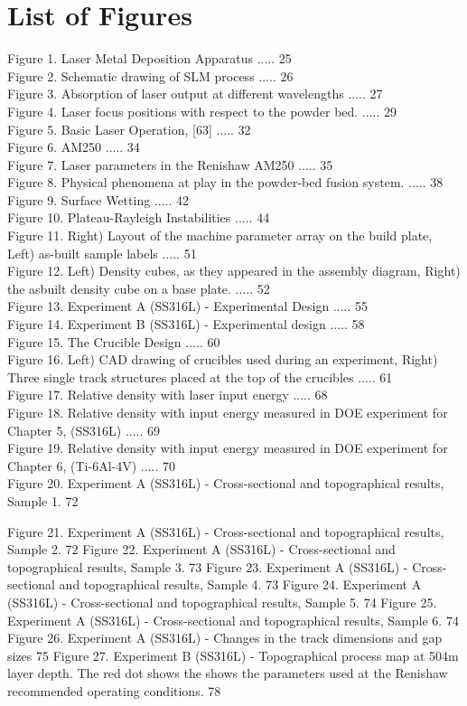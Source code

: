 \documentclass[10pt]{article}
\begin{document}
\section*{List of Figures}
Figure 1. Laser Metal Deposition Apparatus ..... 25\\
Figure 2. Schematic drawing of SLM process ..... 26\\
Figure 3. Absorption of laser output at different wavelengths ..... 27\\
Figure 4. Laser focus positions with respect to the powder bed. ..... 29\\
Figure 5. Basic Laser Operation, [63] ..... 32\\
Figure 6. AM250 ..... 34\\
Figure 7. Laser parameters in the Renishaw AM250 ..... 35\\
Figure 8. Physical phenomena at play in the powder-bed fusion system. ..... 38\\
Figure 9. Surface Wetting ..... 42\\
Figure 10. Plateau-Rayleigh Instabilities ..... 44\\
Figure 11. Right) Layout of the machine parameter array on the build plate, Left) as-built sample labels ..... 51\\
Figure 12. Left) Density cubes, as they appeared in the assembly diagram, Right) the asbuilt density cube on a base plate. ..... 52\\
Figure 13. Experiment A (SS316L) - Experimental Design ..... 55\\
Figure 14. Experiment B (SS316L) - Experimental design ..... 58\\
Figure 15. The Crucible Design ..... 60\\
Figure 16. Left) CAD drawing of crucibles used during an experiment, Right) Three single track structures placed at the top of the crucibles ..... 61\\
Figure 17. Relative density with laser input energy ..... 68\\
Figure 18. Relative density with input energy measured in DOE experiment for Chapter 5, (SS316L) ..... 69\\
Figure 19. Relative density with input energy measured in DOE experiment for Chapter 6, (Ti-6Al-4V) ..... 70\\
Figure 20. Experiment A (SS316L) - Cross-sectional and topographical results, Sample 1. 72

Figure 21. Experiment A (SS316L) - Cross-sectional and topographical results, Sample 2. 72 Figure 22. Experiment A (SS316L) - Cross-sectional and topographical results, Sample 3. 73 Figure 23. Experiment A (SS316L) - Cross-sectional and topographical results, Sample 4. 73 Figure 24. Experiment A (SS316L) - Cross-sectional and topographical results, Sample 5. 74 Figure 25. Experiment A (SS316L) - Cross-sectional and topographical results, Sample 6. 74 Figure 26. Experiment A (SS316L) - Changes in the track dimensions and gap sizes 75 Figure 27. Experiment B (SS316L) - Topographical process map at 504m layer depth. The red dot shows the shows the parameters used at the Renishaw recommended operating conditions. 78
\end{document}
